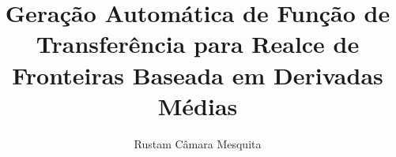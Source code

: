 \documentclass[
master,
brazilian
]{ThesisPUC}
\author{Rustam Câmara Mesquita}
\title{Geração Automática de Função de Transferência para Realce de Fronteiras Baseada em Derivadas Médias}
\begin{document}
%  






  \arial
  
  \normalfont
%  
\end{document}
